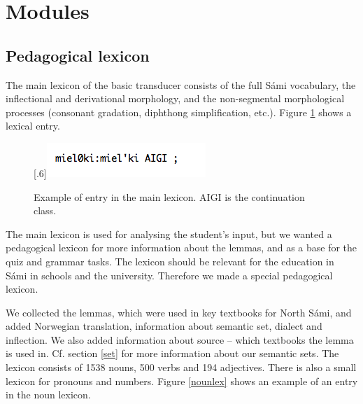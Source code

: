 \documentclass[11pt]{article}
\begin{document}
\section{Modules}

\subsection{Pedagogical lexicon}

The main lexicon of the basic transducer consists of the full Sámi vocabulary, the inflectional and derivational morphology, and the non-segmental morphological processes (consonant gradation, diphthong simplification, etc.). Figure \ref{nounsmelex} shows a lexical entry.

\begin{figure}[htbp]
\begin{center}
\scalebox{.6}[.6]{\includegraphics{presentation/img/noun-sme-lex.png}}\\
\caption{Example of entry in the main lexicon. AIGI is the continuation class.}
\label{nounsmelex}
\end{center}
\end{figure}

The main lexicon is used for analysing the student's input, but we wanted a pedagogical lexicon for more information about the lemmas, and as a base for the quiz and grammar tasks. The lexicon should be relevant for the education in Sámi in schools and the university. Therefore we made a special pedagogical lexicon.

We collected the lemmas, which were used in key textbooks for North Sámi, and added Norwegian translation, information about semantic set, dialect and inflection. We also added information about source -- which textbooks the lemma is used in. Cf. section \ref{set} for more information about our semantic sets. The lexicon consists of 1538 nouns, 500 verbs and 194 adjectives. There is also a small lexicon for pronouns and numbers. Figure \ref{nounlex} shows an example of an entry in the noun lexicon. \\
\end{document}
